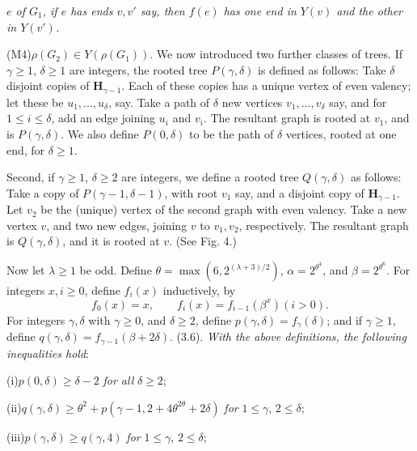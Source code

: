 \noindent\hspace*{12pt}\textit{$e$ of $G_1$, if $e$ has ends $v, v'$ say, then $f(e)$ has one end in $Y(v)$ and the other
in $Y(v')$.}

\hspace*{12pt}(M4)\quad$\rho(G_2)\in Y(\rho(G_1))$.
\stmt
We now introduced two further classes of trees. If $\gamma\ge 1$, $\delta\ge 1$ are
integers, the rooted tree $P(\gamma, \delta)$ is defined as follows: Take $\delta$ disjoint copies
of $\mathbf{H}_{\gamma-1}$. Each of these copies has a unique vertex of even valency; let these
be $u_1,..., u_\delta$, say. Take a path of $\delta$ new vertices $v_1,..., v_\delta$ say, and for
$1\le i\le\delta$, add an edge joining $u_i$ and $v_i$. The resultant graph is rooted at $v_1$,
and is $P(\gamma, \delta)$. We also define $P(0, \delta)$ to be the path of $\delta$ vertices, rooted at
one end, for $\delta\ge 1$.

Second, if $\gamma\ge 1$, $\delta\ge 2$ are integers, we define a rooted tree $Q(\gamma, \delta)$ as
follows: Take a copy of $P(\gamma-1, \delta-1)$, with root $v_1$ say, and a disjoint copy
of $\mathbf{H}_{\gamma-1}$. Let $v_2$ be the (unique) vertex of the second graph with even valency.
Take a new vertex $v$, and two new edges, joining $v$ to $v_1, v_2$, respectively.
The resultant graph is $Q(\gamma, \delta)$, and it is rooted at $v$. (See Fig. 4.)

Now let $\lambda\ge 1$ be odd. Define $\theta=\max(6, 2^{(\lambda+3)/2})$, $\alpha=2^{\theta^4}$, and $\beta=2^{\theta^6}$.
For integers $x, i\ge 0$, define $f_i(x)$ inductively, by
\begin{equation*}
f_0(x)=x,\qquad f_i(x)=f_{i-1}(\beta^x)(i>0).
\end{equation*}
For integers $\gamma, \delta$ with $\gamma\ge 0$, and $\delta\ge 2$, define $p(\gamma, \delta)=f_\gamma(\delta)$; and if $\gamma\ge 1$,
define $q(\gamma, \delta)=f_{\gamma-1}(\beta+2\delta)$.
\stmt
(3.6). \textit{With the above definitions, the following inequalities hold}:

\hspace*{12pt}(i)\enspace $p(0, \delta)\ge\delta-2$ \textit{for all} $\delta\ge 2$;

\hspace*{12pt}(ii)\enspace $q(\gamma, \delta)\ge\theta^2+p(\gamma-1, 2+4\theta^{2\theta}+2\delta)$ \textit{for} $1\le\gamma$, $2\le\delta$;

\hspace*{12pt}(iii)\enspace $p(\gamma, \delta)\ge q(\gamma, 4)$ \textit{for} $1\le\gamma$, $2\le\delta$;

